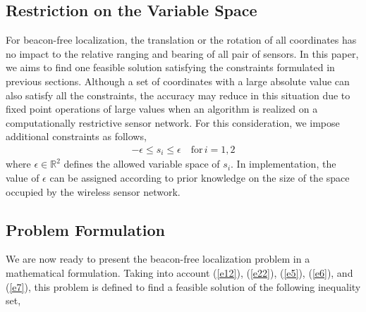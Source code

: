 \documentclass[journal]{IEEEtran}
\begin{document}
\subsection{Restriction on the Variable Space}
For beacon-free localization, the translation or the rotation of all coordinates has no impact to the relative ranging and bearing of all pair of sensors. In this paper, we aims to find one feasible solution satisfying the constraints formulated in previous sections. Although a set of coordinates with a large absolute value can also satisfy all the constraints, the accuracy may reduce in this situation due to fixed point operations of large values when an algorithm is realized on a computationally restrictive sensor network. For this consideration, we impose additional constraints as follows,
\begin{eqnarray}\label{e7}
-\epsilon\leq s_i\leq \epsilon\quad\text{for}\, i=1,2
\end{eqnarray}
where $\epsilon\in\mathbb{R}^2$ defines the allowed variable space of $s_i$. In implementation, the value of $\epsilon$ can be assigned according to prior knowledge on the size of the space occupied by the wireless sensor network.

\subsection{Problem Formulation}

We are now ready to present the beacon-free localization problem in a mathematical formulation. Taking into account (\ref{e12}), (\ref{e22}), (\ref{e5}), (\ref{e6}), and (\ref{e7}), this problem  is defined to find a feasible solution of the following inequality set,
\end{document}
